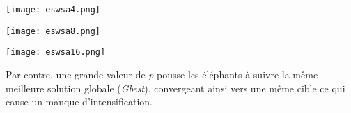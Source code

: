 
		\begin{minipage}{0.3\textwidth}
			\centering
			\texttt{[image: eswsa4.png]}
			\captionsetup{width=.9\linewidth}
			\label{eswsa4}
		\end{minipage}
		\hspace{0.2cm}
		\begin{minipage}{0.3\textwidth}
			\centering
			\texttt{[image: eswsa8.png]}
			\captionsetup{width=.9\linewidth}
			\label{eswsa8}
		\end{minipage}
		\hspace{0.2cm}
		\begin{minipage}{0.3\textwidth}
			\centering
			\texttt{[image: eswsa16.png]}
			\captionsetup{width=.9\linewidth}
			\label{eswsa16}
		\end{minipage}

	
	Par contre, une grande valeur de \textit{p} pousse les éléphants à suivre la même meilleure solution globale (\textit{Gbest}), convergeant ainsi vers une même cible ce qui cause un manque d'intensification.
	
